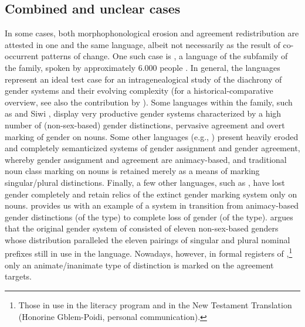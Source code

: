 \documentclass[output=collectionpaper]{langsci/langscibook}
\begin{document}
\subsection{Combined and unclear cases}
\label{subsec:combined}
In some cases, both morphophonological erosion and agreement redistribution are attested in one and the same language, albeit not necessarily as the result of co-occurrent patterns of change.
One such case is , a  language of the  subfamily of the  family, spoken by approximately 6.000 people \citep{Gblem-Poidi2007}. In general, the  languages represent an ideal test case for an intragenealogical study of the diachrony of gender systems and their evolving complexity (for a historical\hyp{}comparative overview, see also the contribution by ). Some languages within the family, such as  \citep{Agbetsoamedo2014} and Siwi \citep{Dingemanse2009}, display very productive gender systems characterized by a high number of (non-sex-based) gender distinctions, pervasive agreement and overt marking of gender on nouns. Some other languages (e.g., ) present heavily eroded and completely semanticized systems of gender assignment and gender agreement, whereby gender assignment and agreement are animacy-based, and traditional noun class marking on nouns is retained merely as a means of marking singular/plural distinctions. Finally, a few other languages, such as  \citep{Soubrier2013}, have lost gender completely and retain relics of the extinct gender marking system only on nouns.  provides us with an example of a system in transition from animacy-based gender distinctions (of the  type) to complete loss of gender (of the  type).  \citet{Gblem-Poidi2007} argues that the original gender system of  consisted of eleven non-sex-based genders whose distribution paralleled the eleven pairings of singular and plural nominal prefixes still in use in the language. Nowadays, however, in formal registers of ,\footnote{Those in use in the literacy program and in the New Testament Translation (Honorine Gblem-Poidi, personal communication).} only an animate/inanimate type of distinction is marked on the agreement targets.
\end{document}
